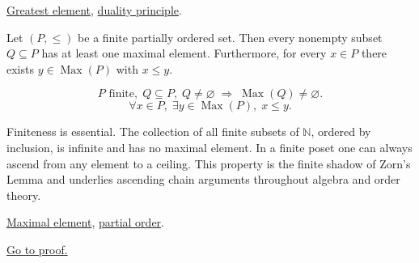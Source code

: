 \begin{remark*}[Dependencies]
\hyperref[def:greatest-element]{Greatest element},
\hyperref[prop:duality-principle]{duality principle}.
\end{remark*}


\begin{proposition}
\label{prop:finite-poset-maximal}
Let $(P, \leq)$ be a finite partially ordered set.  Then every nonempty
subset $Q \subseteq P$ has at least one maximal element.  Furthermore,
for every $x \in P$ there exists $y \in \operatorname{Max}(P)$ with
$x \leq y$.
\end{proposition}

\begin{remark*}
\[
P \text{ finite},\; Q \subseteq P,\; Q \neq \varnothing
\;\Longrightarrow\;
\operatorname{Max}(Q) \neq \varnothing.
\]
\[
\forall x \in P,\; \exists y \in \operatorname{Max}(P),\; x \leq y.
\]
\end{remark*}

\begin{remark*}[Interpretation]
Finiteness is essential.  The collection of all finite subsets of
$\mathbb{N}$, ordered by inclusion, is infinite and has no maximal
element.  In a finite poset one can always ascend from any element to
a ceiling.  This property is the finite shadow of Zorn's Lemma and
underlies ascending chain arguments throughout algebra and order theory.
\end{remark*}

\begin{remark*}[Dependencies]
\hyperref[def:maximal-element]{Maximal element},
\hyperref[def:partial-order]{partial order}.
\end{remark*}

\begin{remark*}[Proof]
\hyperref[prf:finite-poset-maximal]{Go to proof.}
\end{remark*}
